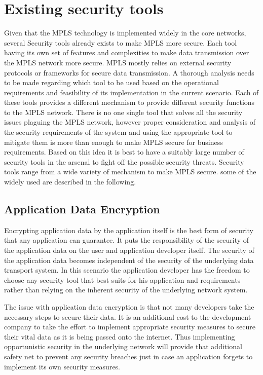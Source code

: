 \section{Existing security tools}
Given that the MPLS technology is implemented widely in the core networks, several Security tools already exists to make MPLS more secure. Each tool having its own set of features and complexities to make data transmission over the MPLS network more secure. MPLS mostly relies on external security protocols or frameworks for secure data transmission. A thorough analysis needs to be made regarding which tool to be used based on the operational requirements and feasibility of its implementation in the current scenario. Each of these tools provides a different mechanism to provide different security functions to the MPLS network. There is no one single tool that solves all the security issues plaguing the MPLS network, however proper consideration and analysis of the security requirements of the system and using the appropriate tool to mitigate them is more than enough to make MPLS secure for business requirements. Based on this idea it is best to have a suitably large number of security tools in the arsenal to fight off the possible security threats. Security tools range from a wide variety of mechanism to make MPLS secure. some of the widely used are described in the following.

\subsection{Application Data Encryption}
Encrypting application data by the application itself is the best form of security that any application can guarantee. It puts the responsibility of the security of the application data on the user and application developer itself. The security of the application data becomes independent of the security of the underlying data transport system. In this scenario the application developer has the freedom to choose any security tool that best suits for his application and requirements rather than relying on the inherent security of the underlying network system.

The issue with application data encryption is that not many developers take the necessary steps to secure their data. It is an additional cost to the development company to take the effort to implement appropriate security measures to secure their vital data as it is being passed onto the internet. Thus implementing opportunistic security in the underlying network will provide that additional safety net to prevent any security breaches just in case an application forgets to implement its own security measures.

